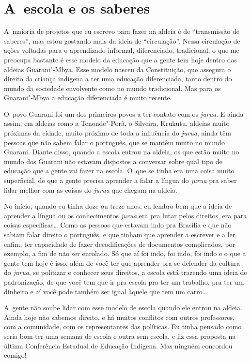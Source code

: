 \section{A~escola e os saberes}

A~maioria de projetos que eu escrevo para fazer na aldeia é de
``transmissão de saberes'', mas estou gostando mais da ideia de
``circulação''. Nessa circulação de ações voltadas para o aprendizado
informal, diferenciado, tradicional, o que me preocupa bastante é esse
modelo da educação que a gente tem hoje dentro das aldeias
Guarani"-Mbya. Esse modelo nasceu da Constituição, que assegura o
direito da criança indígena a ter uma educação diferenciada, tanto
dentro do mundo da sociedade envolvente como no mundo tradicional. Mas
para os Guarani"-Mbya a educação diferenciada é muito recente.

O~povo Guarani foi um dos primeiros povos a ter contato com os \emph{jurua}. E
ainda assim, em aldeias como a Tenonde"-Porã, o Silveira, Krukutu,
aldeias muito próximas da cidade, muito próximo de toda a influência do
\emph{jurua}, ainda têm pessoas que não sabem falar o português, que se mantêm
muito no mundo Guarani. Diante disso, quando a escola entrou na aldeia,
os que estão muito no mundo dos Guarani não estavam dispostos a
conversar sobre qual tipo de educação que a gente vai fazer na escola.
O~que se tinha era uma coisa muito superficial, de que a gente precisa
aprender a falar a língua do \emph{jurua} pra saber lidar melhor com as coisas
do \emph{jurua} que chegam na aldeia. 

No início, quando eu tinha doze ou treze anos, eu lembro bem que a ideia
de aprender a língua ou os conhecimentos \emph{jurua} era pra lutar pelos
direitos, era para coisas específicas\ldots{} Como as pessoas que estavam
indo pra Brasília e que não sabiam falar direito o português, e que
tinham que aprender a escrever e a ler, enfim, ter capacidade de fazer
decodificações de documentos complicados, por exemplo, a fim de não ser
enrolado. Só que aí foi indo, foi indo, foi indo e o que a gente tem
hoje é isso, além de você ter que aprender pra se defender da cultura
do \emph{jurua}, se politizar e conhecer seus direitos, a escola está trazendo
uma ideia de padronização, de que você tem que ir pra escola pra ter um
trabalho, pra ter um dinheiro e aí você pode também ser igual àquele
que tem um carro\ldots{}

A~gente não soube lidar com esse modelo de escola quando ele entrou na
aldeia. Ainda hoje não sabemos direito, e há muitos conflitos com
outros professores, com a comunidade, com os representantes das
políticas. Eu tinha pensado como seria bom ter uma semana de escola e
outra sem escola, e fiz essa proposta na última Conferência Estadual de
Educação Indígena. Mas ninguém concordou comigo!


